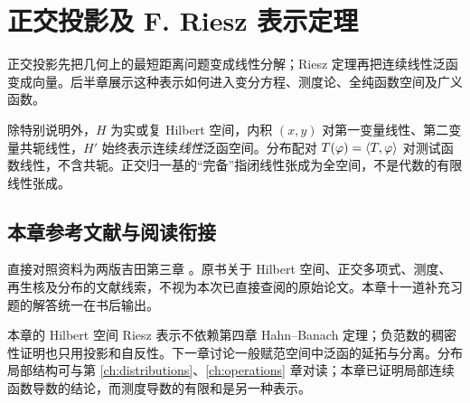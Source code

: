 \chapter{正交投影及 F. Riesz 表示定理}\label{ch:yosida-03}

正交投影先把几何上的最短距离问题变成线性分解；Riesz 定理再把连续线性泛函变成向量。后半章展示这种表示如何进入变分方程、测度论、全纯函数空间及广义函数。

除特别说明外，$H$ 为实或复 Hilbert 空间，内积 $(x,y)$ 对第一变量线性、第二变量共轭线性，$H'$ 始终表示连续\emph{线性}泛函空间。分布配对 $T(\varphi)=\langle T,\varphi\rangle$ 对测试函数线性，不含共轭。正交归一基的“完备”指闭线性张成为全空间，不是代数的有限线性张成。













\section*{本章参考文献与阅读衔接}
{}
直接对照资料为两版吉田第三章 \cite{yosida-zh,yosida-en}。原书关于 Hilbert 空间、正交多项式、测度、再生核及分布的文献线索，不视为本次已直接查阅的原始论文。本章十一道补充习题的解答统一在书后输出。

本章的 Hilbert 空间 Riesz 表示不依赖第四章 Hahn--Banach 定理；负范数的稠密性证明也只用投影和自反性。下一章讨论一般赋范空间中泛函的延拓与分离。分布局部结构可与第 \ref{ch:distributions}、\ref{ch:operations} 章对读；本章已证明局部连续函数导数的结论，而测度导数的有限和是另一种表示。
